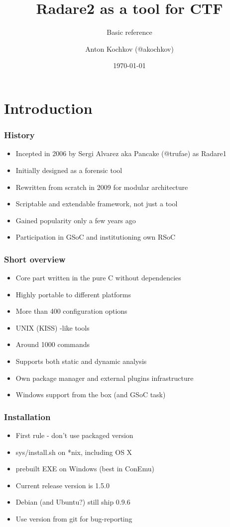 \documentclass[10pt,pdf,utf8,english,compress,hyperref={unicode}]{beamer}
\title{Radare2 as a tool for CTF}
\subtitle{Basic reference}
\author{Anton Kochkov (@akochkov)}
\date{\today}
\institute{KeenLab of Tencent, TCTF 2017}
\begin{document}
\maketitle

\section{Introduction}

\begin{frame}[fragile]
  \frametitle{History}
  \begin{itemize}
	  \item Incepted in 2006 by Sergi Alvarez aka Pancake (@trufae) as Radare1
	  \item Initially designed as a forensic tool
	  \item Rewritten from scratch in 2009 for modular architecture
	  \item Scriptable and extendable framework, not just a tool
	  \item Gained popularity only a few years ago
	  \item Participation in GSoC and institutioning own RSoC
  \end{itemize}
\end{frame}

\begin{frame}[fragile]
  \frametitle{Short overview}
  \begin{itemize}
	\item Core part written in the pure C without dependencies
	\item Highly portable to different platforms
	\item More than 400 configuration options
	\item UNIX (KISS) -like tools
	\item Around 1000 commands
	\item Supports both static and dynamic analysis
	\item Own package manager and external plugins infrastructure
	\item Windows support from the box (and GSoC task)
  \end{itemize}
\end{frame}

\begin{frame}[fragile]
  \frametitle{Installation}
  \begin{itemize}
	  \item First rule - don't use packaged version
	  \item sys/install.sh on *nix, including OS X
	  \item prebuilt EXE on Windows (best in ConEmu)
	  \item Current release version is 1.5.0
	  \item Debian (and Ubuntu?) still ship 0.9.6
	  \item Use version from git for bug-reporting
  \end{itemize}
\end{frame}
\end{document}
